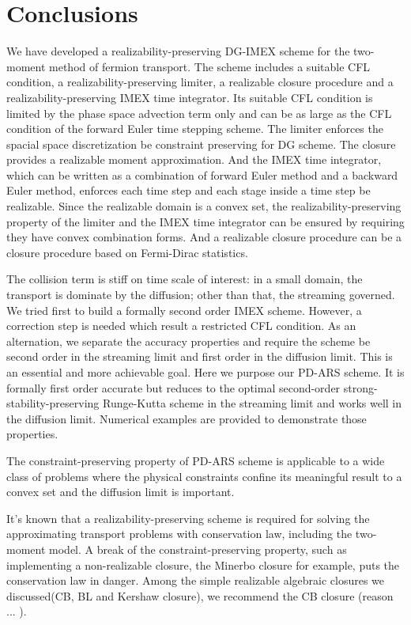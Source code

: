 \section{Conclusions}
\label{sec:conclusions}

We have developed a realizability-preserving DG-IMEX scheme for the two-moment method of fermion transport.
The scheme includes a suitable CFL condition, a realizability-preserving limiter, a realizable closure procedure and a realizability-preserving IMEX time integrator.
Its suitable CFL condition is limited by the phase space advection term only and can be as large as the CFL condition of the forward Euler time stepping scheme. 
The limiter enforces the spacial space discretization be constraint preserving for DG scheme.
The closure provides a realizable moment approximation.
And the IMEX time integrator, which can be written as a combination of forward Euler method and a backward Euler method, enforces each time step and each stage inside a time step be realizable.
Since the realizable domain is a convex set, the realizability-preserving property of the limiter and the IMEX time integrator can be ensured by requiring they have convex combination forms.
And a realizable closure procedure can be a closure procedure based on Fermi-Dirac statistics.

The collision term is stiff on time scale of interest: in a small domain, the transport is dominate by the diffusion; other than that, the streaming governed.
We tried first to build a formally second order IMEX scheme.
However, a correction step is needed which result a restricted CFL condition.
As an alternation, we separate the accuracy properties and require the scheme be second order in the streaming limit and first order in the diffusion limit.
This is an essential and more achievable goal.
Here we purpose our PD-ARS scheme. 
It is formally first order accurate but reduces to the optimal second-order strong-stability-preserving Runge-Kutta scheme in the streaming limit and works well in the diffusion limit. 
Numerical examples are provided to demonstrate those properties.

The constraint-preserving property of PD-ARS scheme is applicable to a wide class of problems where the physical constraints confine its meaningful result to a convex set and the diffusion limit is important.

It's known that a realizability-preserving scheme is required for solving the approximating transport problems with conservation law, including the two-moment model.
A break of the constraint-preserving property, such as implementing a non-realizable closure, the Minerbo closure for example, puts the conservation law in danger.
Among the simple realizable algebraic closures we discussed(CB, BL and Kershaw closure), we recommend the CB closure (reason ... ).
 

